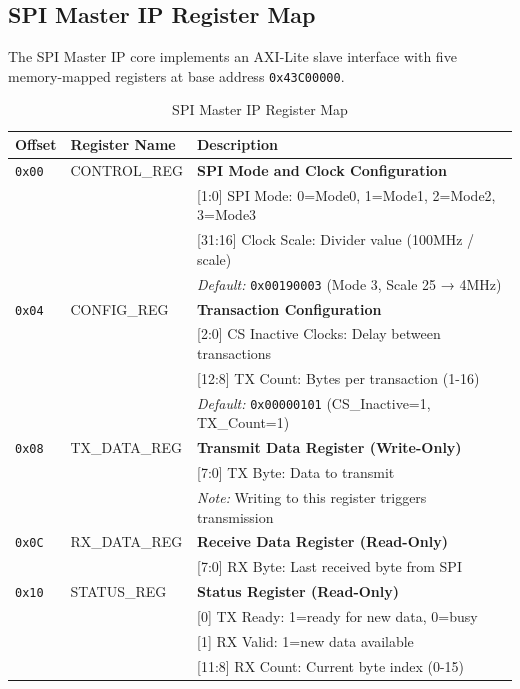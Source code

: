 \documentclass[11pt,a4paper]{article}
\begin{document}
\subsection{SPI Master IP Register Map}

The SPI Master IP core implements an AXI-Lite slave interface with five memory-mapped registers at base address \texttt{0x43C00000}.

\begin{table}[H]
\centering
\caption{SPI Master IP Register Map}
\label{tab:register_map}
\small
\begin{tabularx}{\textwidth}{@{}llX@{}}
\toprule
\textbf{Offset} & \textbf{Register Name} & \textbf{Description} \\ \midrule

\texttt{0x00} & CONTROL\_REG & \textbf{SPI Mode and Clock Configuration} \\
& & [1:0] SPI Mode: 0=Mode0, 1=Mode1, 2=Mode2, 3=Mode3 \\
& & [31:16] Clock Scale: Divider value (100MHz / scale) \\
& & \textit{Default:} \texttt{0x00190003} (Mode 3, Scale 25 → 4MHz) \\
\addlinespace

\texttt{0x04} & CONFIG\_REG & \textbf{Transaction Configuration} \\
& & [2:0] CS Inactive Clocks: Delay between transactions \\
& & [12:8] TX Count: Bytes per transaction (1-16) \\
& & \textit{Default:} \texttt{0x00000101} (CS\_Inactive=1, TX\_Count=1) \\
\addlinespace

\texttt{0x08} & TX\_DATA\_REG & \textbf{Transmit Data Register (Write-Only)} \\
& & [7:0] TX Byte: Data to transmit \\
& & \textit{Note:} Writing to this register triggers transmission \\
\addlinespace

\texttt{0x0C} & RX\_DATA\_REG & \textbf{Receive Data Register (Read-Only)} \\
& & [7:0] RX Byte: Last received byte from SPI \\
\addlinespace

\texttt{0x10} & STATUS\_REG & \textbf{Status Register (Read-Only)} \\
& & [0] TX Ready: 1=ready for new data, 0=busy \\
& & [1] RX Valid: 1=new data available \\
& & [11:8] RX Count: Current byte index (0-15) \\

\bottomrule
\end{tabularx}
\end{table}
\end{document}
